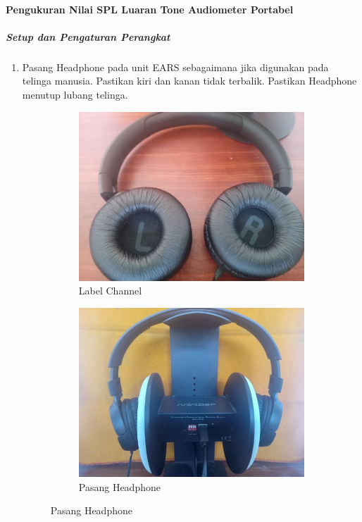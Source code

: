 \documentclass{article}
\begin{document}
	\paragraph{Pengukuran Nilai SPL Luaran Tone Audiometer Portabel}
	\subparagraph{Setup dan Pengaturan Perangkat}
		\begin{enumerate}
			\item Pasang Headphone pada unit EARS sebagaimana jika digunakan pada telinga manusia.
			Pastikan kiri dan kanan tidak terbalik.
			Pastikan Headphone menutup lubang telinga.

			\begin{figure}[H]
				\centering
				\begin{subfigure}[H]{0.4\textwidth}
					\includegraphics[width=\textwidth]{images/pasang/chjbl}
					\caption{Label Channel}
				\end{subfigure}
				\begin{subfigure}[H]{0.4\textwidth}
					\includegraphics[width=\textwidth]{images/pasang/pasangjbl}
					\caption{Pasang Headphone}
				\end{subfigure}


\end{figure}
\end{enumerate}
\end{document}
